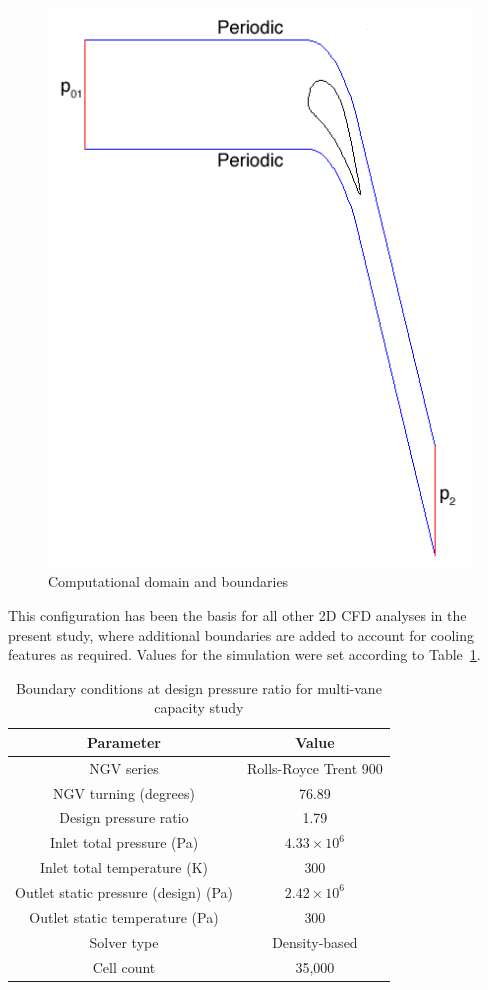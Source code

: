 \documentclass[a4paper, 11pt, oneside]{report}
\begin{document}
\begin{figure}[H]
	\centering
	\includegraphics[width=.6\textwidth]{figs/domain_boundary_conditions.png}
	\caption{Computational domain and boundaries}
	\label{fig:computational_domain_and_boundaries}
\end{figure}

This configuration has been the basis for all other 2D CFD analyses in the present study, where additional boundaries are added to account for cooling features as required. Values for the simulation were set according to Table~\ref{T900_parameters}.

\begin{table}[H]
\caption{Boundary conditions at design pressure ratio for multi-vane capacity study}
\label{T900_parameters}
\begin{center}
\begin{tabular}{|c|c|}
\hline
Parameter & Value\\
\hline
NGV series & Rolls-Royce Trent 900\\
NGV turning (degrees) & 76.89\\
Design pressure ratio & 1.79\\
Inlet total pressure (Pa) & $4.33 \times 10^6$\\
Inlet total temperature (K) & 300\\
Outlet static pressure (design) (Pa) & $2.42 \times 10^6$\\
Outlet static temperature (Pa) & 300\\
Solver type & Density-based\\
Cell count & 35,000\\
\hline
\end{tabular}
\end{center}
\end{table}
\end{document}
